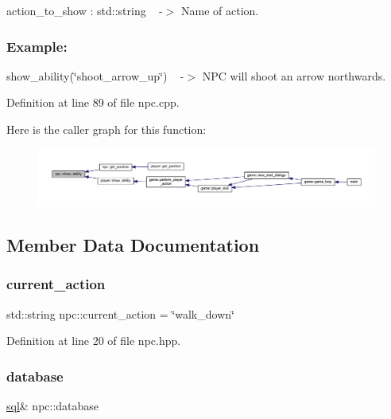 action\+\_\+to\+\_\+show \+: std\+::string ~\newline
-\/$>$ Name of action.

\subsubsection*{Example\+: }

show\+\_\+ability(\char`\"{}shoot\+\_\+arrow\+\_\+up\char`\"{}) ~\newline
-\/$>$ N\+PC will shoot an arrow northwards. 

Definition at line 89 of file npc.\+cpp.

Here is the caller graph for this function\+:
\nopagebreak
\begin{figure}[H]
\begin{center}
\leavevmode
\includegraphics[width=350pt]{classnpc_a2a5bbed340b918265dabc2dcfb5d07b6_icgraph}
\end{center}
\end{figure}


\subsection{Member Data Documentation}
\mbox{\label{classnpc_a3ca0e4e222e0e7fee4d3abd9a3c7c5c4}} 
\subsubsection{\texorpdfstring{current\+\_\+action}{current\_action}}
{\footnotesize\ttfamily std\+::string npc\+::current\+\_\+action = \char`\"{}walk\+\_\+down\char`\"{}\hspace{0.3cm}{\ttfamily [private]}}



Definition at line 20 of file npc.\+hpp.

\mbox{\label{classnpc_a092e6acb7f951c0805d6c4c948ccd37d}} 
\subsubsection{\texorpdfstring{database}{database}}
{\footnotesize\ttfamily \hyperlink{classsql}{sql}\& npc\+::database\hspace{0.3cm}{\ttfamily [private]}}



